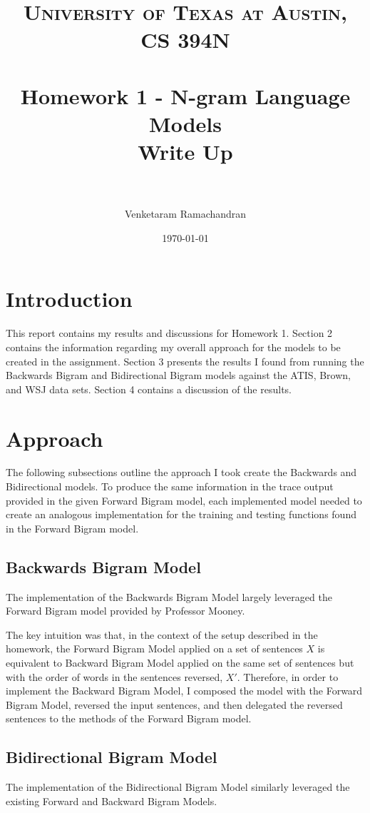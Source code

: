 \documentclass{article} %
\title{	
\normalfont \normalsize 
\textsc{University of Texas at Austin, CS 394N} \\
\horrule{0.6pt} \\[0.4cm] %
\huge Homework 1 - N-gram Language Models \\[0.4cm]
\large Write Up  \\
\horrule{2pt} \\[0.5cm] %
}
\author{Venketaram Ramachandran} %
\date{\normalsize\today} %
\begin{document}
\maketitle %


\section{Introduction}
This report contains my results and discussions for Homework 1. Section 2 contains the information regarding my overall approach for the models to be created in the assignment. Section 3 presents the results I found from running the Backwards Bigram and Bidirectional Bigram models against the ATIS, Brown, and WSJ data sets. Section 4 contains a discussion of the results. 
\section{Approach}
The following subsections outline the approach I took create the Backwards and Bidirectional models. To produce the same information in the trace output provided in the given Forward Bigram model, each implemented model needed to create an analogous implementation for the training and testing functions found in the Forward Bigram model.
\subsection{Backwards Bigram Model}
The implementation of the Backwards Bigram Model largely leveraged the Forward Bigram model provided by Professor Mooney. 

The key intuition was that, in the context of the setup described in the homework, the Forward Bigram Model applied on a set of sentences \(X\) is equivalent to Backward Bigram Model applied on the same set of sentences but with the order of words in the sentences reversed, \(X'\). Therefore, in order to implement the Backward Bigram Model, I composed the model with the Forward Bigram Model, reversed the input sentences, and then delegated the reversed sentences to the methods of the Forward Bigram model.

\subsection{Bidirectional Bigram Model}

The implementation of the Bidirectional Bigram Model similarly leveraged the existing Forward and Backward Bigram Models. 
\end{document}
